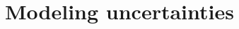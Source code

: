 \documentclass[../thesis.tex]{subfiles}
\begin{document}

\section{Modeling uncertainties}
\label{sec:syst_mod}
\end{document}
